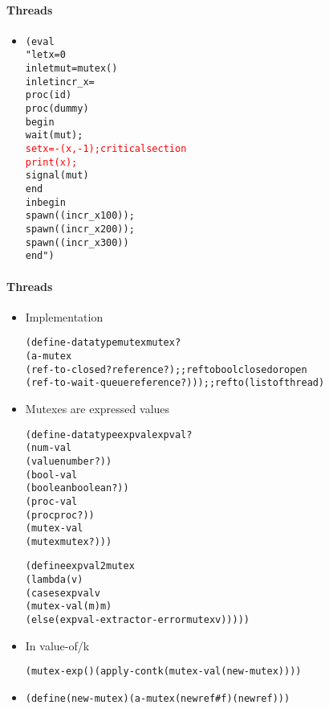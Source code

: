 \documentclass{beamer}
\newcommand{\elist}{\texttt{\textquotesingle{()}}}
\newcommand{\quot}{\texttt{\textquotesingle{}}}
\begin{document}
\begin{frame}[fragile]
\framesubtitle{Threads}
\begin{scriptsize}
\begin{itemize}
\item<1->
\begin{alltt}
(eval 
 "let x = 0
  in let mut = mutex()
     in let incr_x = 
              proc (id) 
                proc (dummy)
                  begin
                    wait(mut);     
                    \textcolor{red}{set x = -(x, -1);  critical section
                    print(x);}      
                    signal(mut)
                  end
        in begin
             spawn((incr_x 100));
             spawn((incr_x 200));
             spawn((incr_x 300))
           end")
\end{alltt}

\end{itemize}
\end{scriptsize}
\end{frame}

\begin{frame}[fragile]
\framesubtitle{Threads}
\begin{scriptsize}
\begin{itemize}
\item<1-> Implementation
\begin{alltt}
(define-datatype mutex mutex?
  (a-mutex
   (ref-to-closed? reference?)      ;; ref to bool closed or open
   (ref-to-wait-queue reference?))) ;; ref to (listof thread)
\end{alltt}

\item<2-> Mutexes are expressed values
\begin{alltt}
(define-datatype expval expval?
  (num-val
   (value number?))
  (bool-val
   (boolean boolean?))
  (proc-val
   (proc proc?))
  (mutex-val
   (mutex mutex?)))
   
(define expval2mutex
  (lambda (v)
    (cases expval v
      (mutex-val (m) m)
      (else (expval-extractor-error \quot{}mutex v)))))
\end{alltt}

\item<3-> In value-of/k
\begin{alltt}
(mutex-exp () (apply-cont k (mutex-val (new-mutex))))
\end{alltt}

\item<3->
\begin{alltt}
(define (new-mutex) (a-mutex (newref #f)   (newref \elist{})))
\end{alltt}

\end{itemize}
\end{scriptsize}
\end{frame}
\end{document}
